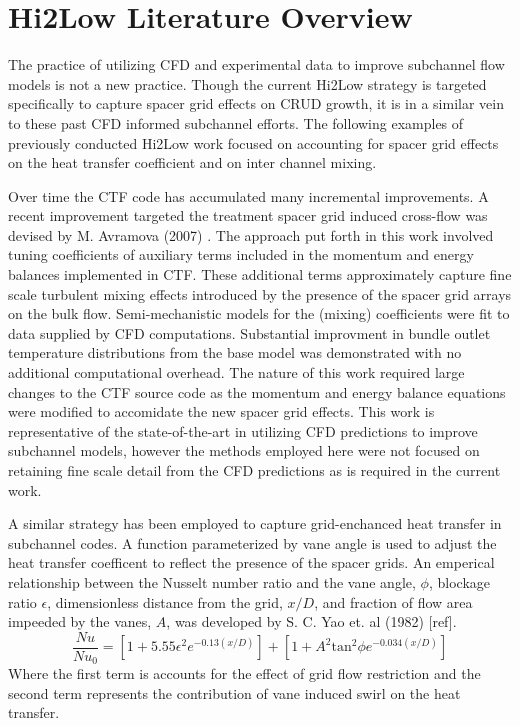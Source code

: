 \section{Hi2Low Literature Overview}

The practice of utilizing CFD and experimental data to improve subchannel flow models is not a new practice.  Though the current Hi2Low strategy is targeted specifically to capture spacer grid effects on CRUD growth, it is in a similar vein to these past CFD informed subchannel efforts.  The following examples of previously conducted Hi2Low work focused on accounting for spacer grid effects on the heat transfer coefficient and on inter channel mixing. 

Over time the CTF code has accumulated many incremental improvements.  A recent improvement targeted the treatment spacer grid induced cross-flow was devised by M. Avramova (2007) \cite{avramova2007}. 
The approach put forth in this work involved tuning coefficients of auxiliary terms included in the momentum and energy balances implemented in CTF.  These additional terms approximately capture fine scale turbulent mixing effects introduced by the presence of the spacer grid arrays on the bulk flow.  Semi-mechanistic models for the (mixing) coefficients were fit to data supplied by CFD computations.  Substantial improvment in bundle outlet temperature distributions from the base model was demonstrated with no additional computational overhead.  The nature of this work required large changes to the CTF source code as the momentum and energy balance equations were modified to accomidate the new spacer grid effects.   This work is representative of the state-of-the-art in utilizing CFD predictions to improve subchannel models, however the methods employed here were not focused on retaining fine scale detail from the CFD predictions as is required in the current work.

A similar strategy has been employed to capture grid-enchanced heat transfer in subchannel codes.   A function parameterized by vane angle is used to adjust the heat transfer coefficent to reflect the presence of the spacer grids.  An emperical relationship between the Nusselt number ratio and the vane angle, $\phi$, blockage ratio $\epsilon$, dimensionless distance from the grid, $x/D$, and fraction of flow area impeeded by the vanes, $A$, was developed by S. C. Yao et. al (1982) [ref].
\begin{equation}
\frac{Nu}{Nu_0}  = \left[ 1 + 5.55 \epsilon^2 e^{-0.13(x/D)}\right] + \left[ 1 + A^2\mathrm{tan}^2\phi e^{-0.034(x/D)} \right]
\end{equation}
Where the first term is accounts for the effect of grid flow restriction and the second term represents the contribution of vane induced swirl on the heat transfer.

